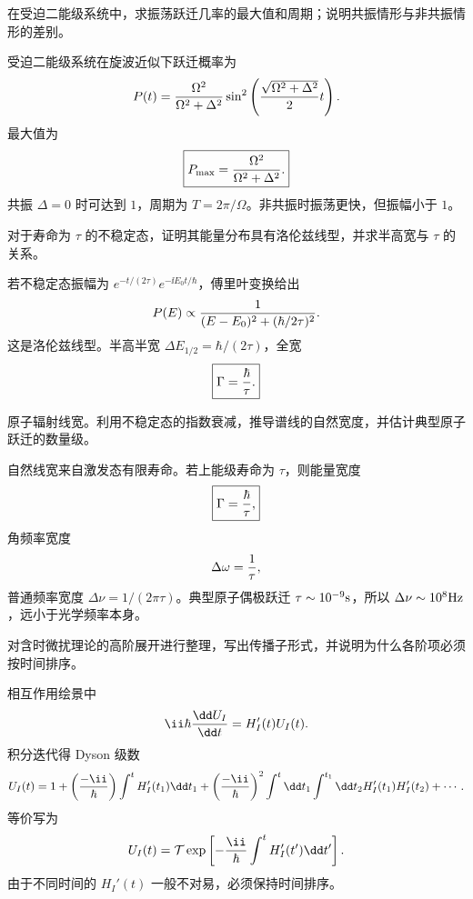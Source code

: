 \begin{question}
在受迫二能级系统中，求振荡跃迁几率的最大值和周期；说明共振情形与非共振情形的差别。
\end{question}
\begin{solution}
受迫二能级系统在旋波近似下跃迁概率为
\[
P(t)={\Omega^2\over\Omega^2+\Delta^2}
\sin^2\left({\sqrt{\Omega^2+\Delta^2}\over2}t\right).
\]
最大值为
\[
\boxed{P_{\max}={\Omega^2\over\Omega^2+\Delta^2}.}
\]
共振 $\Delta=0$ 时可达到 $1$，周期为 $\boxed{T=2\pi/\Omega}$。非共振时振荡更快，但振幅小于 $1$。
\end{solution}

\begin{question}
对于寿命为 $\tau$ 的不稳定态，证明其能量分布具有洛伦兹线型，并求半高宽与 $\tau$ 的关系。
\end{question}
\begin{solution}
若不稳定态振幅为 $e^{-t/(2\tau)}e^{-\ii E_0t/\hbar}$，傅里叶变换给出
\[
P(E)\propto {1\over(E-E_0)^2+(\hbar/2\tau)^2}.
\]
这是洛伦兹线型。半高半宽 $\Delta E_{1/2}=\hbar/(2\tau)$，全宽
\[
\boxed{\Gamma={\hbar\over\tau}.}
\]
\end{solution}

\begin{question}
原子辐射线宽。利用不稳定态的指数衰减，推导谱线的自然宽度，并估计典型原子跃迁的数量级。
\end{question}
\begin{solution}
自然线宽来自激发态有限寿命。若上能级寿命为 $\tau$，则能量宽度
\[
\boxed{\Gamma={\hbar\over\tau},}
\]
角频率宽度
\[
\Delta\omega={1\over\tau},
\]
普通频率宽度 $\boxed{\Delta\nu=1/(2\pi\tau)}$。典型原子偶极跃迁 $\tau\sim10^{-9}{\rm s}$，所以 $\Delta\nu\sim10^8{\rm Hz}$，远小于光学频率本身。
\end{solution}

\begin{question}
对含时微扰理论的高阶展开进行整理，写出传播子形式，并说明为什么各阶项必须按时间排序。
\end{question}
\begin{solution}
相互作用绘景中
\[
\ii\hbar {\dd U_I\over\dd t}=H_I'(t)U_I(t).
\]
积分迭代得 Dyson 级数
\[
U_I(t)=1+\left({-\ii\over\hbar}\right)\int^t H_I'(t_1)\dd t_1
+\left({-\ii\over\hbar}\right)^2\int^t\dd t_1\int^{t_1}\dd t_2 H_I'(t_1)H_I'(t_2)+\cdots.
\]
等价写为
\[
U_I(t)=\mathcal T\exp\left[-{\ii\over\hbar}\int^t H_I'(t')\dd t'\right].
\]
由于不同时间的 $H_I'(t)$ 一般不对易，必须保持时间排序。
\end{solution}

